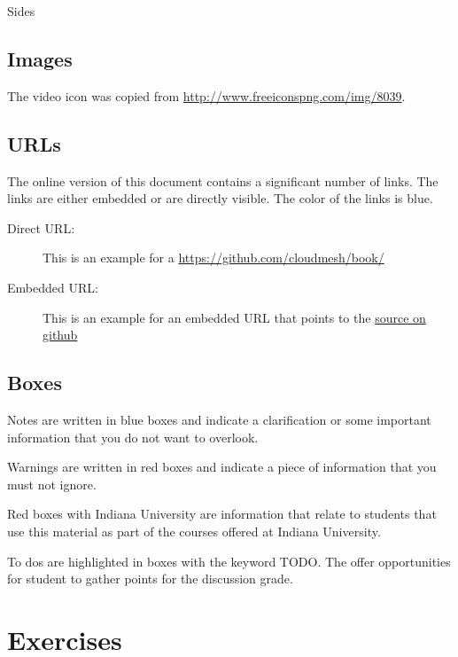Sides

\subsection{Images}

The video icon was copied from \url{http://www.freeiconspng.com/img/8039}.

\subsection{URLs}

The online version of this document contains a significant number of
links. The links are either embedded or are directly visible. The
color of the links is blue.

\begin{description}
\item[Direct URL:] This is an example for a
  \url{https://github.com/cloudmesh/book/}
\item[Embedded URL:] This is an example for an embedded URL that
  points to the \href{https://github.com/cloudmesh/book/}{source on github}
\end{description}

\subsection{Boxes}

\begin{NOTE}
Notes are written in blue boxes and indicate a clarification or some
important information that you do not want to overlook.
\end{NOTE}

\begin{WARNING}
Warnings are written in red  boxes and indicate a piece of information
that you must not ignore.
\end{WARNING}

\begin{IU}
Red boxes with Indiana University are information that relate to
students that use this material as part of the courses offered at
Indiana University.
\end{IU}

To dos are highlighted in boxes with the keyword TODO. The offer
opportunities for student to gather points for the discussion grade.


\section{Exercises}
\bigskip

